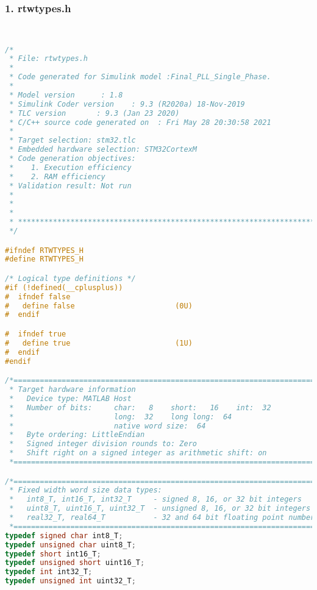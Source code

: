 \subsubsection{1. rtwtypes.h}
\begin{lstlisting}[language=C,caption=Model.c]


/*
 * File: rtwtypes.h
 *
 * Code generated for Simulink model :Final_PLL_Single_Phase.
 *
 * Model version      : 1.8
 * Simulink Coder version    : 9.3 (R2020a) 18-Nov-2019
 * TLC version       : 9.3 (Jan 23 2020)
 * C/C++ source code generated on  : Fri May 28 20:30:58 2021
 *
 * Target selection: stm32.tlc
 * Embedded hardware selection: STM32CortexM
 * Code generation objectives:
 *    1. Execution efficiency
 *    2. RAM efficiency
 * Validation result: Not run
 *
 *
 *
 * ******************************************************************************
 */

#ifndef RTWTYPES_H
#define RTWTYPES_H

/* Logical type definitions */
#if (!defined(__cplusplus))
#  ifndef false
#   define false                       (0U)
#  endif

#  ifndef true
#   define true                        (1U)
#  endif
#endif

/*=======================================================================*
 * Target hardware information
 *   Device type: MATLAB Host
 *   Number of bits:     char:   8    short:   16    int:  32
 *                       long:  32    long long:  64
 *                       native word size:  64
 *   Byte ordering: LittleEndian
 *   Signed integer division rounds to: Zero
 *   Shift right on a signed integer as arithmetic shift: on
 *=======================================================================*/

/*=======================================================================*
 * Fixed width word size data types:                                     *
 *   int8_T, int16_T, int32_T     - signed 8, 16, or 32 bit integers     *
 *   uint8_T, uint16_T, uint32_T  - unsigned 8, 16, or 32 bit integers   *
 *   real32_T, real64_T           - 32 and 64 bit floating point numbers *
 *=======================================================================*/
typedef signed char int8_T;
typedef unsigned char uint8_T;
typedef short int16_T;
typedef unsigned short uint16_T;
typedef int int32_T;
typedef unsigned int uint32_T;


\end{lstlisting}

